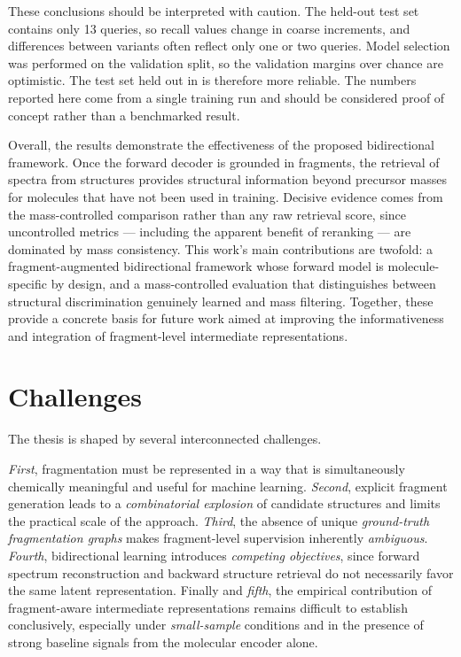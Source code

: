 These conclusions should be interpreted with caution.
The held-out test set contains only 13 queries, so recall values change in coarse increments, and differences between variants often reflect only one or two queries.
Model selection was performed on the validation split, so the validation margins over chance are optimistic.
The test set held out in  is therefore more reliable.
The numbers reported here come from a single training run and should be considered proof of concept rather than a benchmarked result.

Overall, the results demonstrate the effectiveness of the proposed bidirectional framework. Once the forward decoder is grounded in fragments, the retrieval of spectra from structures provides structural information beyond precursor masses for molecules that have not been used in training.
Decisive evidence comes from the mass-controlled comparison rather than any raw retrieval score, since uncontrolled metrics — including the apparent benefit of reranking — are dominated by mass consistency.
This work's main contributions are twofold: a fragment-augmented bidirectional framework whose forward model is molecule-specific by design, and a mass-controlled evaluation that distinguishes between structural discrimination genuinely learned and mass filtering.
Together, these provide a concrete basis for future work aimed at improving the informativeness and integration of fragment-level intermediate representations.


%
%


\section{Challenges}
The thesis is shaped by several interconnected challenges.

\emph{First}, fragmentation must be represented in a way that is simultaneously chemically meaningful and useful for machine learning.
\emph{Second}, explicit fragment generation leads to a \emph{combinatorial explosion} of candidate structures and limits the practical scale of the approach.
\emph{Third}, the absence of unique \emph{ground-truth fragmentation graphs} makes fragment-level supervision inherently \emph{ambiguous}.
\emph{Fourth}, bidirectional learning introduces \emph{competing objectives}, since forward spectrum reconstruction and backward structure retrieval do not necessarily favor the same latent representation.
Finally and \emph{fifth}, the empirical contribution of fragment-aware intermediate representations remains difficult to establish conclusively, especially under \emph{small-sample} conditions and in the presence of strong baseline signals from the molecular encoder alone.


